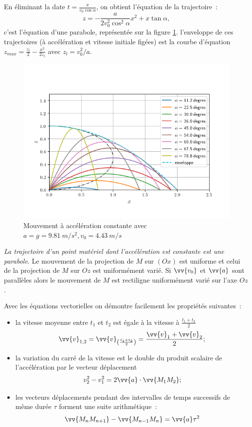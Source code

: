 En éliminant la date $t=\frac{x}{v_0\cos\alpha}$, on obtient l'équation de la trajectoire~:
\begin{equation}
  z = -\frac{a}{2v_0^2\cos^2\alpha}x^2+x\tan\alpha,
\end{equation}
c'est l'équation d'une parabole, représentée sur la figure \ref{fig:acceleration_constante}. l'enveloppe de ces trajectoires (à accélération et vitesse initiale figées) est la courbe d'équation $z_{max} = \frac{z_l}{2} - \frac{x^2}{2 z_l}$ avec $z_l = v_0^2/a$.

\begin{figure}
	\centering
	\includegraphics[width=0.8\linewidth]{acceleration_constante}
	\caption{Mouvement à accélération constante avec $a = g = \SI{9,81}{m/s^2}, v_0=\SI{4.43}{m/s}$}
	\label{fig:acceleration_constante}
\end{figure}

\emph{La trajectoire d'un point matériel dont l'accélération est constante est une parabole}. Le mouvement de la projection de $M$ sur $(Ox)$ est uniforme et celui de la projection de $M$ sur $Oz$ est uniformément varié. Si $\vv{v_0}$ et $\vv{a}$ sont parallèles alors le mouvement de $M$ est rectiligne uniformément varié sur l'axe $Oz$.

Avec les équations vectorielles on démontre facilement les propriétés suivantes~:
\begin{itemize}
\item la vitesse moyenne entre $t_1$ et $t_2$ est égale à la vitesse à $\frac{t_1+t_2}{2}$
  \begin{equation}
    \vv{v}_{1,2}=\vv{v}_{\left(\frac{t_1+t_2}{2}\right)}=\frac{\vv{v}_1+\vv{v}_2}{2};
  \end{equation}
\item la variation du carré de la vitesse est le double du produit scalaire de l'accélération par le vecteur déplacement
  \begin{equation}
v_2^2-v_1^2=2\vv{a}\cdot \vv{M_1M_2};
  \end{equation}
\item les vecteurs déplacements pendant des intervalles de temps successifs de même durée $\tau$ forment une suite arithmétique~:
  \begin{equation}
    \vv{M_nM_{n+1}}-\vv{M_{n-1}M_{n}}=\vv{a}\tau^2
  \end{equation}
\end{itemize}

